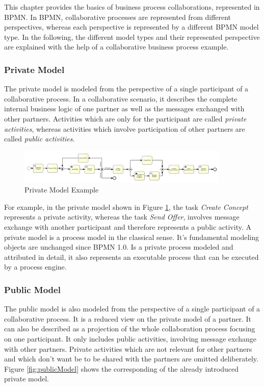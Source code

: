 This chapter provides the basics of business process collaborations, represented in BPMN. In BPMN, collaborative processes are represented from different perspectives, whereas each perspective is represented by a different BPMN model type. In the following, the different model types and their represented perspective are explained with the help of a collaborative business process example.

\subsubsection{Private Model}
The private model is modeled from the perspective of a single participant of a collaborative process. In a collaborative scenario, it describes the complete internal business logic of one partner as well as the messages exchanged with other partners. Activities which are only for the participant are called \textit{private activities}, whereas activities which involve participation of other partners are called \textit{public activities}.\\

\begin{figure}[H]
\centering
\includegraphics[width=0.9\textwidth]{src/images/private_process_agency.png}
\caption{Private Model Example}
\label{fig:privateModel}
\end{figure}

For example, in the private model shown in Figure \ref{fig:privateModel}, the task \textit{Create Concept} represents a private activity, whereas the task \textit{Send Offer}, involves message exchange with another participant and therefore represents a public activity. A private model is a process model in the classical sense. It's fundamental modeling objects are unchanged since BPMN 1.0. Is a private process modeled and attributed in detail, it also represents an executable process that can be executed by a process engine.

\subsubsection{Public Model}
The public model is also modeled from the perspective of a single participant of a collaborative process. It is a reduced view on the private model of a partner. It can also be described as a projection of the whole collaboration process focusing on one participant. It only includes public activities, involving message exchange with other partners. Private activities which are not relevant for other partners and which don't want be to be shared with the partners are omitted deliberately. Figure \ref{fig:publicModel} shows the corresponding of the already introduced private model. 

